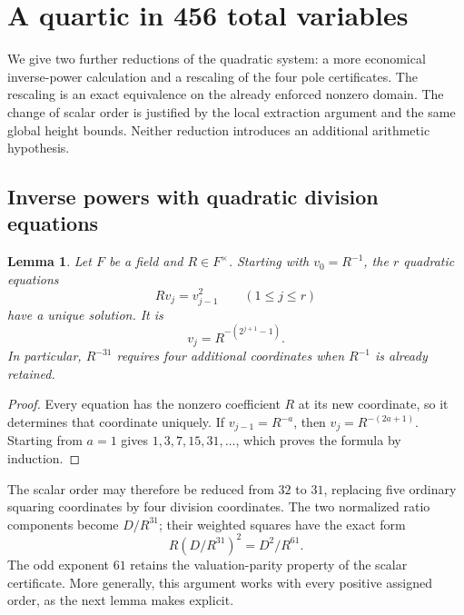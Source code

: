 \documentclass[11pt,a4paper]{article}
\newtheorem{lemma}[theorem]{Lemma}
\theoremstyle{definition}
\theoremstyle{remark}
\begin{document}
\section{A quartic in 456 total variables}
\label{sec:quartic456}

We give two further reductions of the quadratic system: a more economical
inverse-power calculation and a rescaling of the four pole certificates.
The rescaling is an exact equivalence on the already enforced nonzero
domain. The change of scalar order is justified by the local extraction
argument and the same global height bounds. Neither reduction introduces
an additional arithmetic hypothesis.

\subsection{Inverse powers with quadratic division equations}

\begin{lemma}\label{q456:inverse-powers}
Let $F$ be a field and $R\in F^\times$. Starting with $v_0=R^{-1}$,
the $r$ quadratic equations
\[
                         Rv_j=v_{j-1}^2\qquad(1\le j\le r)
\]
have a unique solution. It is
\[
                         v_j=R^{-(2^{j+1}-1)}.
\]
In particular, $R^{-31}$ requires four additional coordinates when
$R^{-1}$ is already retained.
\end{lemma}
\begin{proof}
Every equation has the nonzero coefficient $R$ at its new coordinate,
so it determines that coordinate uniquely. If $v_{j-1}=R^{-a}$,
then $v_j=R^{-(2a+1)}$. Starting from $a=1$ gives
$1,3,7,15,31,\ldots$, which proves the formula by induction.
\end{proof}

The scalar order may therefore be reduced from $32$ to $31$, replacing
five ordinary squaring coordinates by four division coordinates. The
two normalized ratio components become $D/R^{31}$; their weighted
squares have the exact form
\[
                         R(D/R^{31})^2=D^2/R^{61}.
\]
The odd exponent $61$ retains the valuation-parity property of the
scalar certificate. More generally, this argument works with every
positive assigned order, as the next lemma makes explicit.
\end{document}
